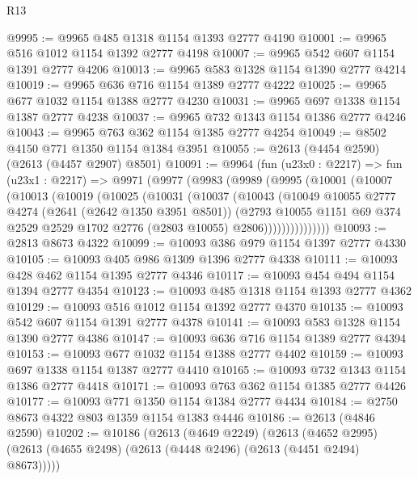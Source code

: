 \begin{lexlean}{R13}
\begin{coremodule}
@9995 := @9965 @485 @1318 @1154 @1393 @2777 @4190
@10001 := @9965 @516 @1012 @1154 @1392 @2777 @4198
@10007 := @9965 @542 @607 @1154 @1391 @2777 @4206
@10013 := @9965 @583 @1328 @1154 @1390 @2777 @4214
@10019 := @9965 @636 @716 @1154 @1389 @2777 @4222
@10025 := @9965 @677 @1032 @1154 @1388 @2777 @4230
@10031 := @9965 @697 @1338 @1154 @1387 @2777 @4238
@10037 := @9965 @732 @1343 @1154 @1386 @2777 @4246
@10043 := @9965 @763 @362 @1154 @1385 @2777 @4254
@10049 := @8502 @4150 @771 @1350 @1154 @1384 @3951
@10055 := @2613 (@4454 @2590) (@2613 (@4457 @2907) @8501)
@10091 := @9964
    (fun (u23x0 : @2217) =>
    fun (u23x1 : @2217) =>
    @9971
      (@9977
        (@9983
          (@9989
            (@9995
              (@10001
                (@10007
                  (@10013
                    (@10019
                      (@10025
                        (@10031
                          (@10037
                            (@10043
                              (@10049
                                @10055
                                @2777
                                @4274
                                (@2641 (@2642 @1350 @3951 @8501))
                                (@2793
                                  @10055
                                  @1151
                                  @69
                                  @374
                                  @2529
                                  @2529
                                  @1702
                                  @2776
                                  (@2803 @10055)
                                  @2806)))))))))))))))
@10093 := @2813 @8673 @4322
@10099 := @10093 @386 @979 @1154 @1397 @2777 @4330
@10105 := @10093 @405 @986 @1309 @1396 @2777 @4338
@10111 := @10093 @428 @462 @1154 @1395 @2777 @4346
@10117 := @10093 @454 @494 @1154 @1394 @2777 @4354
@10123 := @10093 @485 @1318 @1154 @1393 @2777 @4362
@10129 := @10093 @516 @1012 @1154 @1392 @2777 @4370
@10135 := @10093 @542 @607 @1154 @1391 @2777 @4378
@10141 := @10093 @583 @1328 @1154 @1390 @2777 @4386
@10147 := @10093 @636 @716 @1154 @1389 @2777 @4394
@10153 := @10093 @677 @1032 @1154 @1388 @2777 @4402
@10159 := @10093 @697 @1338 @1154 @1387 @2777 @4410
@10165 := @10093 @732 @1343 @1154 @1386 @2777 @4418
@10171 := @10093 @763 @362 @1154 @1385 @2777 @4426
@10177 := @10093 @771 @1350 @1154 @1384 @2777 @4434
@10184 := @2750 @8673 @4322 @803 @1359 @1154 @1383 @4446
@10186 := @2613 (@4846 @2590)
@10202 := @10186
    (@2613
      (@4649 @2249)
      (@2613 (@4652 @2995) (@2613 (@4655 @2498) (@2613 (@4448 @2496) (@2613 (@4451 @2494) @8673)))))

\end{coremodule}
\end{lexlean}
